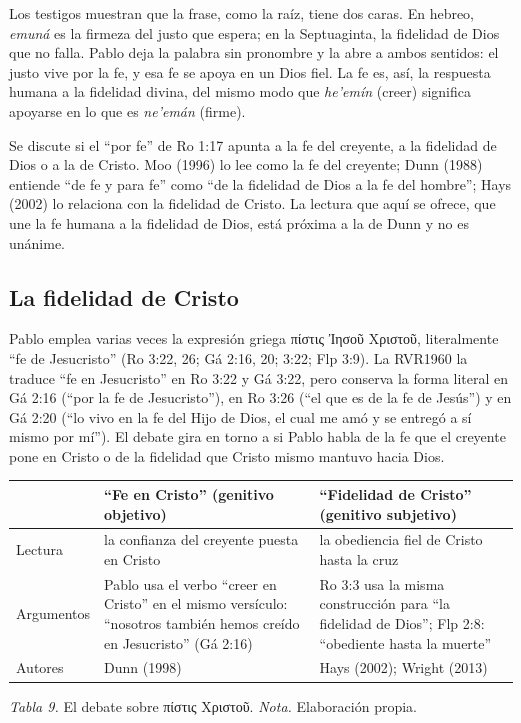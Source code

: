 \documentclass[11pt,letterpaper]{article}
\newcommand{\grc}[1]{\foreignlanguage{ancientgreek}{#1}}
\begin{document}
Los testigos muestran que la frase, como la raíz, tiene dos caras. En hebreo, \emph{emuná} es la firmeza del justo que espera; en la Septuaginta, la fidelidad de Dios que no falla. Pablo deja la palabra sin pronombre y la abre a ambos sentidos: el justo vive por la fe, y esa fe se apoya en un Dios fiel. La fe es, así, la respuesta humana a la fidelidad divina, del mismo modo que \emph{he'emín} (creer) significa apoyarse en lo que es \emph{ne'emán} (firme).

\begin{nota}[Precisión]
Se discute si el ``por fe'' de Ro 1:17 apunta a la fe del creyente, a la fidelidad de Dios o a la de Cristo. Moo (1996) lo lee como la fe del creyente; Dunn (1988) entiende ``de fe y para fe'' como ``de la fidelidad de Dios a la fe del hombre''; Hays (2002) lo relaciona con la fidelidad de Cristo. La lectura que aquí se ofrece, que une la fe humana a la fidelidad de Dios, está próxima a la de Dunn y no es unánime.
\end{nota}

\subsection{La fidelidad de Cristo}
Pablo emplea varias veces la expresión griega \grc{πίστις Ἰησοῦ Χριστοῦ}, literalmente ``fe de Jesucristo'' (Ro 3:22, 26; Gá 2:16, 20; 3:22; Flp 3:9). La RVR1960 la traduce ``fe en Jesucristo'' en Ro 3:22 y Gá 3:22, pero conserva la forma literal en Gá 2:16 (``por la fe de Jesucristo''), en Ro 3:26 (``el que es de la fe de Jesús'') y en Gá 2:20 (``lo vivo en la fe del Hijo de Dios, el cual me amó y se entregó a sí mismo por mí''). El debate gira en torno a si Pablo habla de la fe que el creyente pone en Cristo o de la fidelidad que Cristo mismo mantuvo hacia Dios.

\begin{center}\small\renewcommand{\arraystretch}{1.25}
\begin{tabular}{@{}L{3.6cm}L{5.4cm}L{5.4cm}@{}}
\toprule
 & \textbf{``Fe en Cristo''} (genitivo objetivo) & \textbf{``Fidelidad de Cristo''} (genitivo subjetivo) \\ \midrule
Lectura & la confianza del creyente puesta en Cristo & la obediencia fiel de Cristo hasta la cruz \\
Argumentos & Pablo usa el verbo ``creer en Cristo'' en el mismo versículo: ``nosotros también hemos creído en Jesucristo'' (Gá 2:16) & Ro 3:3 usa la misma construcción para ``la fidelidad de Dios''; Flp 2:8: ``obediente hasta la muerte'' \\
Autores & Dunn (1998) & Hays (2002); Wright (2013) \\
\bottomrule
\end{tabular}\par
{\footnotesize\color{gris}\textit{Tabla 9.} El debate sobre \grc{πίστις Χριστοῦ}. \textit{Nota.} Elaboración propia.}
\end{center}
\end{document}
